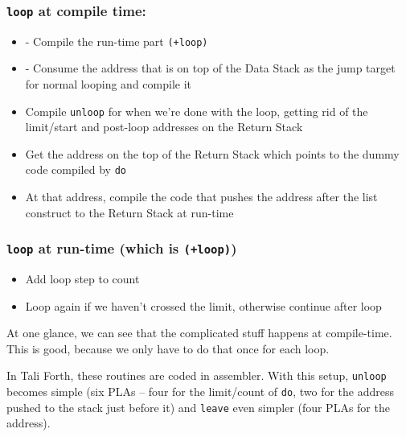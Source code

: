 \subsubsection{\texttt{loop} at compile time:}

\begin{itemize}

        \item - Compile the run-time part \texttt{(+loop)}

        \item - Consume the address that is on top of the Data Stack as the jump
                target for normal looping and compile it

        \item Compile \texttt{unloop} for when we're done with the loop, getting
                rid of the limit/start and post-loop addresses on the Return
                Stack 

        \item  Get the address on the top of the Return Stack which points to
                the dummy code compiled by \texttt{do}

        \item At that address, compile the code that pushes the address after
                the list construct to the Return Stack at run-time

\end{itemize}

\subsubsection{\texttt{loop} at run-time (which is \texttt{(+loop)}) }

\begin{itemize}

        \item Add loop step to count

        \item Loop again if we haven't crossed the limit, otherwise continue
                after loop

\end{itemize}

At one glance, we can see that the complicated stuff happens at compile-time.
This is good, because we only have to do that once for each loop. 

In Tali Forth, these routines are coded in assembler. With this setup,
\texttt{unloop} becomes simple (six PLAs -- four for the limit/count of
\texttt{do}, two for the address pushed to the stack just before it) and
\texttt{leave} even simpler (four PLAs for the address). 

